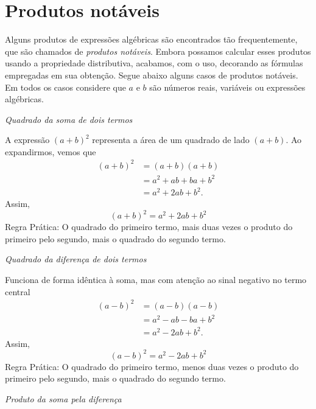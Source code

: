 \section{Produtos notáveis}

Alguns produtos de expressões algébricas são encontrados tão frequentemente,
que são chamados de
\emph{produtos notáveis}.
Embora possamos calcular esses
produtos usando a propriedade distributiva, acabamos, com o uso, decorando as
fórmulas empregadas em sua obtenção. Segue abaixo alguns casos de produtos
notáveis. Em todos os casos considere que $a$ e $b$ são números reais,
variáveis ou expressões algébricas.

\emph{Quadrado da soma de dois termos}

A expressão $(a + b)^2$ representa a área de um quadrado de lado $(a+b)$.
Ao expandirmos, vemos que
\begin{align*}
  (a+b)^2
  & = (a+b) (a+b)           \\
  & = a^2 + ab + ba + b^2   \\
  & = a^2 + 2ab + b^2.
\end{align*}
Assim,
\begin{equation}
  \label{eq:produto_notavel_1}
  (a+b)^2 = a^2 + 2ab + b^2
\end{equation}
Regra Prática: O quadrado do primeiro termo, mais duas vezes o produto do
primeiro pelo segundo, mais o quadrado do segundo termo.

\emph{Quadrado da diferença de dois termos}

Funciona de forma idêntica à soma,
mas com atenção ao sinal negativo no termo central
\begin{align*}
  (a-b)^2
  & = (a-b) (a-b)         \\
  & = a^2 - ab - ba + b^2 \\
  & = a^2 - 2ab + b^2.
\end{align*}
Assim,
\begin{equation}
  \label{eq:produto_notavel_2}
  (a-b)^2 = a^2 - 2ab + b^2
\end{equation}
Regra Prática: O quadrado do primeiro termo, menos duas vezes o
produto do primeiro pelo segundo, mais o quadrado do segundo termo.

\emph{Produto da soma pela diferença}


